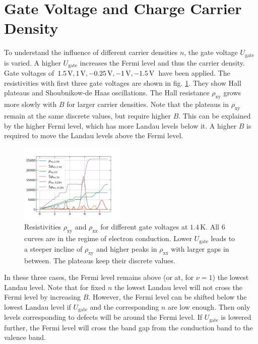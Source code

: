\section{Gate Voltage and Charge Carrier Density}
To understand the influence of different carrier densities $n$, the gate voltage $U_\text{gate}$ is varied.
A higher $U_\text{gate}$ increases the Fermi level and thus the carrier density.
Gate voltages of $1.5 \,\text V, 1 \,\text V, -0.25 \,\text V, -1 \,\text V, -1.5 \,\text V$ have been applied.
The resistivities with first three gate voltages are shown in fig. \ref{fig:differentGateVoltagesQHE}.
They show Hall plateaus and Shoubnikow-de Haas oscillations.
The Hall resistance $\rho_\text{xy}$ grows more slowly with $B$ for larger carrier densities.
Note that the plateaus in $\rho_\text{xy}$ remain at the same discrete values, but require higher $B$.
This can be explained by the higher Fermi level, which has more Landau levels below it.
A higher $B$ is required to move the Landau levels above the Fermi level.
\begin{figure}[h]
    \centering
    \includegraphics[width=0.45\textwidth]{../Images/differentGateVoltagesQHE.png}
    \caption{Resistivities $\rho_\text{xy}$ and $\rho_\text{xx}$ for different gate voltages at $1.4\,\text{K}$. 
    All 6 curves are in the regime of electron conduction.
    Lower $U_\text{gate}$
     leads to a steeper incline of $\rho_\text{xy}$ and higher peaks in $\rho_\text{xx}$ with larger gaps in between.
    The plateaus keep their discrete values.
}
    \label{fig:differentGateVoltagesQHE}
\end{figure}
In these three cases, the Fermi level remains above (or at, for $\nu=1$) the lowest Landau level.
Note that for fixed $n$ the lowest Landau level will not cross the Fermi level by increasing $B$.
However, the Fermi level can be shifted below the lowest Landau level if $U_\text{gate}$ and the corresponding $n$ are low enough.
Then only levels corresponding to defects will be around the Fermi level.
If $U_\text{gate}$ is lowered further, the Fermi level will cross the band gap from the conduction band to the valence band.
